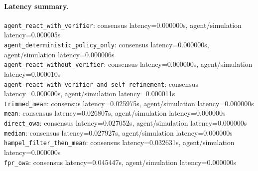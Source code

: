 \paragraph{Latency summary.}
\texttt{agent_react_with_verifier}: consensus latency=0.000000s, agent/simulation latency=0.000005s\\
\texttt{agent_deterministic_policy_only}: consensus latency=0.000000s, agent/simulation latency=0.000006s\\
\texttt{agent_react_without_verifier}: consensus latency=0.000000s, agent/simulation latency=0.000010s\\
\texttt{agent_react_with_verifier_and_self_refinement}: consensus latency=0.000000s, agent/simulation latency=0.000011s\\
\texttt{trimmed_mean}: consensus latency=0.025975s, agent/simulation latency=0.000000s\\
\texttt{mean}: consensus latency=0.026807s, agent/simulation latency=0.000000s\\
\texttt{direct_owa}: consensus latency=0.027052s, agent/simulation latency=0.000000s\\
\texttt{median}: consensus latency=0.027927s, agent/simulation latency=0.000000s\\
\texttt{hampel_filter_then_mean}: consensus latency=0.032631s, agent/simulation latency=0.000000s\\
\texttt{fpr_owa}: consensus latency=0.045447s, agent/simulation latency=0.000000s
